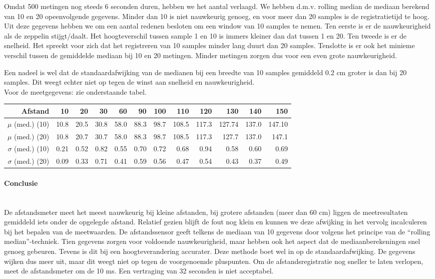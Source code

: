 \documentclass[tt]{penoverslag}
\begin{document}
Omdat 500 metingen nog steeds 6 seconden duren, hebben we het aantal verlaagd. We hebben d.m.v. rolling median de mediaan berekend van 10 en 20 opeenvolgende gegevens. Minder dan 10 is niet nauwkeurig genoeg, en voor meer dan 20 samples is de registratietijd te hoog. Uit deze gegevens hebben we om een aantal redenen besloten om een window van 10 samples te nemen.  Ten eerste is er de nauwkeurigheid als de zeppelin stijgt/daalt. Het hoogteverschil tussen sample 1 en 10 is immers kleiner dan dat tussen 1 en 20. Ten tweede is er de snelheid. Het spreekt voor zich dat het registreren van 10 samples minder lang duurt dan 20 samples. Tenslotte is er ook het minieme verschil tussen de gemiddelde mediaan bij 10 en 20 metingen. Minder metingen zorgen dus voor een even grote nauwkeurigheid. 

Een nadeel is wel dat de standaardafwijking van de medianen bij een breedte van 10 samples gemiddeld 0.2 cm groter is dan bij 20 samples. Dit weegt echter niet op tegen de winst aan snelheid en nauwkeurigheid.\\ 

Voor de meetgegevens: zie onderstaande tabel. \\

\begin{tabular}{r||r|r|r|r|r|r|r|r|r|r|r}
\textbf{Afstand} & 10 & 20 & 30 & 60 & 90 & 100 & 110 & 120 & 130 & 140 & 150 \\
\hline \hline 
$\mu$ (med.) (10) & 10.8 & 20.5 & 30.8 & 58.0 & 88.3 & 98.7 & 108.5 & 117.3 & 127.74 & 137.0 & 147.10 \\
$\mu$ (med.) (20) & 10.8 & 20.7 & 30.7 & 58.0 & 88.3 & 98.7 & 108.5 & 117.3 & 127.7 & 137.0 & 147.1 \\
$\sigma$ (med.) (10) & 0.21 & 0.52 & 0.82 & 0.55 & 0.70 & 0.72 & 0.68 & 0.94 & 0.58 & 0.60 & 0.69 \\
$\sigma$ (med.) (20)& 0.09 & 0.33 & 0.71 & 0.41 & 0.59 & 0.56 & 0.47 & 0.54 & 0.43 & 0.37 & 0.49 \\
\end{tabular}

\paragraph{Conclusie} ~\\ 
De afstandsmeter meet het meest nauwkeurig bij kleine afstanden, bij grotere afstanden (meer dan 60 cm) liggen de meetresultaten gemiddeld iets onder de opgelegde afstand. Relatief gezien blijft de fout nog klein en kunnen we deze afwijking in het vervolg incalculeren bij het bepalen van de meetwaarden. De afstandssensor geeft telkens de mediaan van 10 gegevens door volgens het principe van de “rolling median”-techniek. Tien gegevens zorgen voor voldoende nauwkeurigheid, maar hebben ook het aspect dat de mediaanberekeningen snel genoeg gebeuren. Tevens is dit bij een hoogteverandering accurater. Deze methode boet wel in op de standaardafwijking. De gegevens wijken dus meer uit, maar dit weegt niet op tegen de voorgenoemde pluspunten. Om de afstandsregistratie nog sneller te laten verlopen, meet de afstandsmeter om de 10 ms. Een vertraging van 32 seconden is niet acceptabel.
\end{document}
